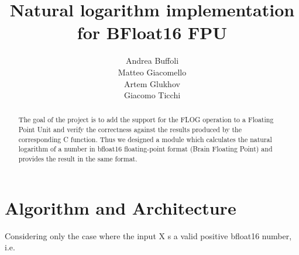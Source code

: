 \documentclass{report}
\begin{document}





\title{Natural logarithm implementation for BFloat16 FPU}
\author{
Andrea Buffoli\\
Matteo Giacomello\\
Artem Glukhov\\
Giacomo Ticchi
}


\maketitle
\begin{abstract}
The goal of the project is to add the support for the FLOG operation to a Floating Point Unit and verify the correctness against the results produced by the corresponding C function.
Thus we designed a module which calculates the natural logarithm of a number in bfloat16 floating-point format (Brain Floating Point) and provides the result in the same format. 

\end{abstract}

\chapter{Algorithm and Architecture}
Considering only the case where the input X s a valid positive bfloat16 number, i.e.
\end{document}
